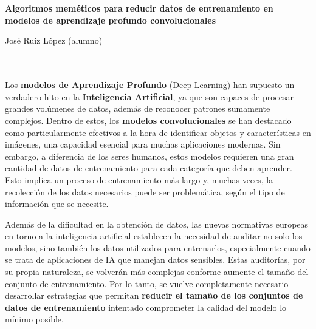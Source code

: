 
\chapter*{}



\cleardoublepage
\thispagestyle{empty}

\begin{center}
       {\large\bfseries Algoritmos meméticos para reducir datos de entrenamiento en modelos de aprendizaje profundo
              convolucionales}\\
\end{center}
\begin{center}
       José Ruiz López (alumno)\\
\end{center}

\\

\vspace{0.7cm}
\\

Los \textbf{modelos de Aprendizaje Profundo} (Deep Learning) han supuesto un verdadero hito en la
\textbf{Inteligencia Artificial}, ya que son capaces de procesar grandes volúmenes de datos, además de reconocer
patrones sumamente complejos.
Dentro de estos, los \textbf{modelos convolucionales} se han destacado como particularmente efectivos a la hora de
identificar objetos y características en imágenes, una capacidad esencial para muchas aplicaciones modernas.
Sin embargo, a diferencia de los seres humanos, estos modelos requieren una gran cantidad de datos de
entrenamiento para cada categoría que deben aprender.
Esto implica un proceso de entrenamiento más largo y, muchas veces, la recolección de los datos necesarios puede ser
problemática, según el tipo de información que se necesite.

Además de la dificultad en la obtención de datos,  las nuevas normativas europeas en torno a la inteligencia artificial
establecen la necesidad de auditar no solo los modelos, sino también los datos
utilizados para entrenarlos, especialmente cuando se trata de aplicaciones de IA que manejan datos sensibles.
Estas auditorías, por su propia naturaleza, se volverán más complejas conforme aumente el tamaño del conjunto de
entrenamiento.
Por lo tanto, se vuelve completamente necesario desarrollar estrategias que permitan
\textbf{reducir el tamaño de los conjuntos de datos de entrenamiento} intentado comprometer la calidad del modelo lo mínimo posible.

